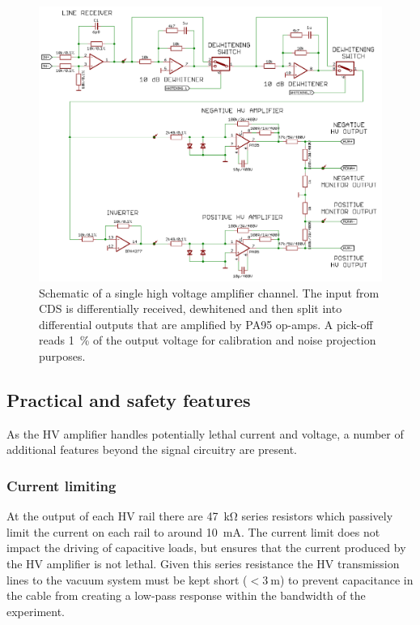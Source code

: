 \begin{figure}
  \centering
  \includegraphics[width=\columnwidth]{graphics/60-hv-amp-signal-path.pdf}
  \caption[High voltage amplifier signal schematic]{\label{fig:hv-amp-signal-path}Schematic of a single high voltage amplifier channel. The input from \gls{CDS} is differentially received, dewhitened and then split into differential outputs that are amplified by PA95 op-amps. A pick-off reads \SI{1}{\percent} of the output voltage for calibration and noise projection purposes.}
\end{figure}

\subsection{Practical and safety features}
As the \gls{HV} amplifier handles potentially lethal current and voltage, a number of additional features beyond the signal circuitry are present.

\subsubsection{\label{sec:hv-amp-current-limit}Current limiting}
At the output of each \gls{HV} rail there are \SI{47}{\kilo\ohm} series resistors which passively limit the current on each rail to around \SI{10}{\milli\ampere}. The current limit does not impact the driving of capacitive loads, but ensures that the current produced by the \gls{HV} amplifier is not lethal. Given this series resistance the \gls{HV} transmission lines to the vacuum system must be kept short ($<\SI{3}{\meter}$) to prevent capacitance in the cable from creating a low-pass response within the bandwidth of the experiment.

